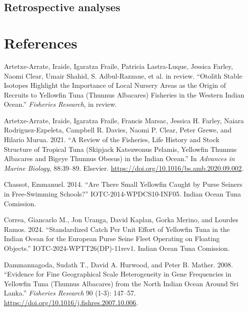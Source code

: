 \documentclass[
]{scrartcl}
\newlength{\cslhangindent}
\newenvironment{CSLReferences}[2] %
 {\begin{list}{}{%
  \setlength{\itemindent}{0pt}
  \setlength{\leftmargin}{0pt}
  \setlength{\parsep}{0pt}
  \ifodd #1
   \setlength{\leftmargin}{\cslhangindent}
   \setlength{\itemindent}{-1\cslhangindent}
  \fi
  \setlength{\itemsep}{#2\baselineskip}}}
 {\end{list}}
\begin{document}
\subsection{Retrospective analyses}\label{retrospective-analyses}

\newpage{}

\section*{References}\label{references}

\label{refs}
\begin{CSLReferences}{1}{0}
Artetxe-Arrate, Iraide, Igaratza Fraile, Patricia Lastra-Luque, Jessica
Farley, Naomi Clear, Umair Shahid, S. Adbul-Razzaue, et al. in review.
{``Otolith Stable Isotopes Highlight the Importance of Local Nursery
Areas as the Origin of Recruits to Yellowfin Tuna ({Thunnus} Albacares)
Fisheries in the Western {Indian Ocean}.''} \emph{Fisheries Research},
in review.

Artetxe-Arrate, Iraide, Igaratza Fraile, Francis Marsac, Jessica H.
Farley, Naiara Rodriguez-Ezpeleta, Campbell R. Davies, Naomi P. Clear,
Peter Grewe, and Hilario Murua. 2021. {``A Review of the Fisheries, Life
History and Stock Structure of Tropical Tuna (Skipjack {Katsuwonus}
Pelamis, Yellowfin {Thunnus} Albacares and Bigeye {Thunnus} Obesus) in
the {Indian Ocean}.''} In \emph{Advances in {Marine Biology}},
88:39--89. Elsevier. \url{https://doi.org/10.1016/bs.amb.2020.09.002}.

Chassot, Emmanuel. 2014. {``Are There Small Yellowfin Caught by Purse
Seiners in Free-Swimming Schools?''} IOTC-2014-WPDCS10-INF05. Indian
Ocean Tuna Comission.

Correa, Giancarlo M., Jon Uranga, David Kaplan, Gorka Merino, and
Lourdes Ramos. 2024. {``Standardized Catch Per Unit Effort of Yellowfin
Tuna in the {Indian Ocean} for the {European} Purse Seine Fleet
Operating on Floating Objects.''} IOTC-2024-WPTT26(DP)-11rev1. Indian
Ocean Tuna Comission.

Dammannagoda, Sudath T., David A. Hurwood, and Peter B. Mather. 2008.
{``Evidence for Fine Geographical Scale Heterogeneity in Gene
Frequencies in Yellowfin Tuna ({Thunnus} Albacares) from the North
{Indian Ocean} Around {Sri Lanka}.''} \emph{Fisheries Research} 90
(1-3): 147--57. \url{https://doi.org/10.1016/j.fishres.2007.10.006}.


\end{CSLReferences}
\end{document}
